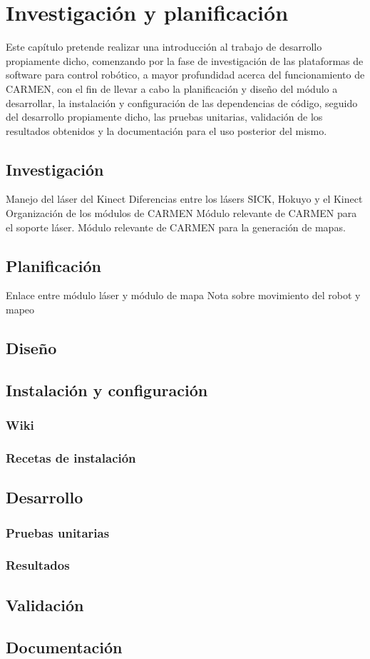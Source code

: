 \chapter{Investigación y planificación}

Este capítulo pretende realizar una introducción al trabajo de desarrollo propiamente dicho, comenzando por la fase de investigación de las plataformas de software para control robótico, a mayor profundidad acerca del funcionamiento de CARMEN, con el fin de llevar a cabo la planificación y diseño del módulo a desarrollar, la instalación y configuración de las dependencias de código, seguido del desarrollo propiamente dicho, las pruebas unitarias, validación de los resultados obtenidos y la documentación para el uso posterior del mismo.

\section{Investigación}

Manejo del láser del Kinect
Diferencias entre los lásers SICK, Hokuyo y el Kinect
Organización de los módulos de CARMEN
Módulo relevante de CARMEN para el soporte láser.
Módulo relevante de CARMEN para la generación de mapas.

\section{Planificación}

Enlace entre módulo láser y módulo de mapa
Nota sobre movimiento del robot y mapeo

\section{Diseño}

\section{Instalación y configuración}

\subsection{Wiki}

\subsection{Recetas de instalación}

\section{Desarrollo}

\subsection{Pruebas unitarias}

\subsection{Resultados}

\section{Validación}

\section{Documentación}